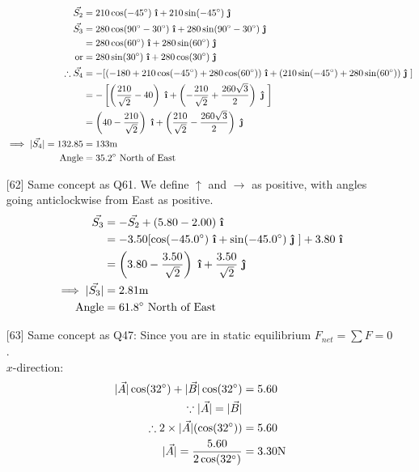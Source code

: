 \documentclass[11pt]{article}
\newcommand{\uvec}[1]{\boldsymbol{\hat{\textbf{#1}}}}
\begin{document}
\begin{enumerate}
\begin{align*}
				\vec{S_2} &= 210\cos(-45\degree)~\uvec{\i} + 210\sin(-45\degree) ~\uvec{\j} \\
				\vec{S_3} &= 280\cos(90\degree-30\degree)~\uvec{\i} + 280\sin(90\degree-30\degree) ~\uvec{\j} \\
				&= 280\cos(60\degree)~\uvec{\i} + 280\sin(60\degree) ~\uvec{\j} \\
				\text{or}&= 280\sin(30\degree)~\uvec{\i} + 280\cos(30\degree) ~\uvec{\j} \\
				\therefore \vec{S_4} &= -[(-180 + 210\cos(-45\degree) + 280\cos(60\degree))~\uvec{\i} +  (210\sin(-45\degree) + 280\sin(60\degree))~\uvec{\j}~] \\
				&= -\left[ \left( \frac{210}{\sqrt{2}} - 40\right)~\uvec{\i} + \left(-\frac{210}{\sqrt{2}} + \frac{260\sqrt{3}}{2}\right)~\uvec{\j}~ \right] \\
				&= \left(40 - \frac{210}{\sqrt{2}}\right)~\uvec{\i} + \left(\frac{210}{\sqrt{2}} - \frac{260\sqrt{3}}{2}\right)~\uvec{\j} \\
				\implies |\vec{S_4}| = 132.85 &= 133 \text{m} \\
				\text{Angle} &= 35.2 \degree ~\text{North of East}
			\end{align*}
		\item[{[62]}] Same concept as Q61. We define $\uparrow$ and $\rightarrow$ as positive, with angles going anticlockwise from East as positive. 
			\begin{align*}
				\vec{S_3} &= -\vec{S_2} + (5.80 - 2.00) ~\uvec{\i} \\
				&= -3.50[\cos(-45.0\degree) ~\uvec{\i} + \sin(-45.0\degree) ~\uvec{\j}~] + 3.80 ~\uvec{\i} \\
				&= \left(3.80-\frac{3.50}{\sqrt{2}}\right)~\uvec{\i} + \frac{3.50}{\sqrt{2}} ~\uvec{\j} \\
				\implies |\vec{S_3}| &= 2.81 \text{m} \\
				\text{Angle} &=61.8 \degree ~\text{North of East}
			\end{align*}
		\item[{[63]}] Same concept as Q47: Since you are in static equilibrium $F_{net} = \sum F = 0$. \\
		$x$-direction:
			\begin{align*}
				|\vec{A}|\cos(32\degree) + |\vec{B}|\cos(32\degree) &= 5.60 \\
				\because |\vec{A}| = |\vec{B}| \\
				\therefore 2\times|\vec{A}|(\cos(32\degree))  &=5.60 \\
				|\vec{A}| = \frac{5.60}{2\cos(32\degree)} &= 3.30\text{N}

\end{align*}
\end{enumerate}
\end{document}
